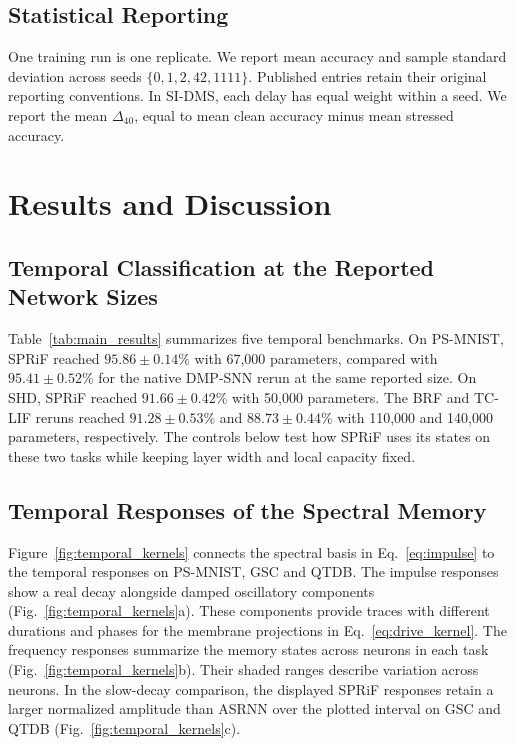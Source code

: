 \documentclass[letterpaper,journal]{IEEEtran}
\begin{document}
\subsection{Statistical Reporting}
\label{sec:statistics}

One training run is one replicate. We report mean accuracy and sample standard deviation across seeds $\{0,1,2,42,1111\}$. Published entries retain their original reporting conventions. In SI-DMS, each delay has equal weight within a seed. We report the mean $\Delta_{40}$, equal to mean clean accuracy minus mean stressed accuracy.

\section{Results and Discussion}
\label{sec:results}

\subsection{Temporal Classification at the Reported Network Sizes}

Table~\ref{tab:main_results} summarizes five temporal benchmarks. On PS-MNIST, SPRiF reached $95.86\pm0.14\%$ with 67,000 parameters, compared with $95.41\pm0.52\%$ for the native DMP-SNN rerun at the same reported size. On SHD, SPRiF reached $91.66\pm0.42\%$ with 50,000 parameters. The BRF and TC-LIF reruns reached $91.28\pm0.53\%$ and $88.73\pm0.44\%$ with 110,000 and 140,000 parameters, respectively. The controls below test how SPRiF uses its states on these two tasks while keeping layer width and local capacity fixed.

\subsection{Temporal Responses of the Spectral Memory}
\label{sec:temporal_responses}

Figure~\ref{fig:temporal_kernels} connects the spectral basis in Eq.~\eqref{eq:impulse} to the temporal responses on PS-MNIST, GSC and QTDB. The impulse responses show a real decay alongside damped oscillatory components (Fig.~\ref{fig:temporal_kernels}a). These components provide traces with different durations and phases for the membrane projections in Eq.~\eqref{eq:drive_kernel}. The frequency responses summarize the memory states across neurons in each task (Fig.~\ref{fig:temporal_kernels}b). Their shaded ranges describe variation across neurons. In the slow-decay comparison, the displayed SPRiF responses retain a larger normalized amplitude than ASRNN over the plotted interval on GSC and QTDB (Fig.~\ref{fig:temporal_kernels}c).
\end{document}

